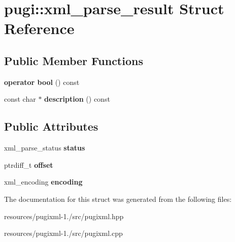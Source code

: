 \hypertarget{structpugi_1_1xml__parse__result}{\section{pugi\+:\+:xml\+\_\+parse\+\_\+result Struct Reference}
\label{structpugi_1_1xml__parse__result}
}
\subsection*{Public Member Functions}
\begin{DoxyCompactItemize}
\item 
\hypertarget{structpugi_1_1xml__parse__result_a1fd8f66dd233df5f76f63dea8627e589}{{\bfseries operator bool} () const }\label{structpugi_1_1xml__parse__result_a1fd8f66dd233df5f76f63dea8627e589}

\item 
\hypertarget{structpugi_1_1xml__parse__result_add183854c1798f4c8ae74f40def79b03}{const char $\ast$ {\bfseries description} () const }\label{structpugi_1_1xml__parse__result_add183854c1798f4c8ae74f40def79b03}

\end{DoxyCompactItemize}
\subsection*{Public Attributes}
\begin{DoxyCompactItemize}
\item 
\hypertarget{structpugi_1_1xml__parse__result_af8b3e6badea671931017695c8a9dd1af}{xml\+\_\+parse\+\_\+status {\bfseries status}}\label{structpugi_1_1xml__parse__result_af8b3e6badea671931017695c8a9dd1af}

\item 
\hypertarget{structpugi_1_1xml__parse__result_adb61df40459ba6fb1083d22467983086}{ptrdiff\+\_\+t {\bfseries offset}}\label{structpugi_1_1xml__parse__result_adb61df40459ba6fb1083d22467983086}

\item 
\hypertarget{structpugi_1_1xml__parse__result_ad11f279dfce644dfe297e24dc5f72c01}{xml\+\_\+encoding {\bfseries encoding}}\label{structpugi_1_1xml__parse__result_ad11f279dfce644dfe297e24dc5f72c01}

\end{DoxyCompactItemize}


The documentation for this struct was generated from the following files\+:\begin{DoxyCompactItemize}
\item 
resources/pugixml-\/1./src/pugixml.\+hpp\item 
resources/pugixml-\/1./src/pugixml.\+cpp\end{DoxyCompactItemize}
